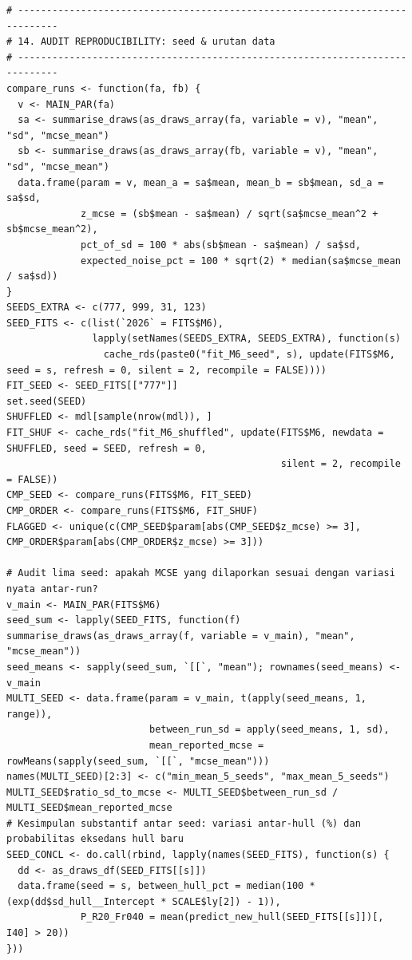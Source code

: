 \documentclass[
]{article}
\begin{document}
\begin{verbatim}
# -----------------------------------------------------------------------------
# 14. AUDIT REPRODUCIBILITY: seed & urutan data
# -----------------------------------------------------------------------------
compare_runs <- function(fa, fb) {
  v <- MAIN_PAR(fa)
  sa <- summarise_draws(as_draws_array(fa, variable = v), "mean", "sd", "mcse_mean")
  sb <- summarise_draws(as_draws_array(fb, variable = v), "mean", "sd", "mcse_mean")
  data.frame(param = v, mean_a = sa$mean, mean_b = sb$mean, sd_a = sa$sd,
             z_mcse = (sb$mean - sa$mean) / sqrt(sa$mcse_mean^2 + sb$mcse_mean^2),
             pct_of_sd = 100 * abs(sb$mean - sa$mean) / sa$sd,
             expected_noise_pct = 100 * sqrt(2) * median(sa$mcse_mean / sa$sd))
}
SEEDS_EXTRA <- c(777, 999, 31, 123)
SEED_FITS <- c(list(`2026` = FITS$M6),
               lapply(setNames(SEEDS_EXTRA, SEEDS_EXTRA), function(s)
                 cache_rds(paste0("fit_M6_seed", s), update(FITS$M6, seed = s, refresh = 0, silent = 2, recompile = FALSE))))
FIT_SEED <- SEED_FITS[["777"]]
set.seed(SEED)
SHUFFLED <- mdl[sample(nrow(mdl)), ]
FIT_SHUF <- cache_rds("fit_M6_shuffled", update(FITS$M6, newdata = SHUFFLED, seed = SEED, refresh = 0,
                                                silent = 2, recompile = FALSE))
CMP_SEED <- compare_runs(FITS$M6, FIT_SEED)
CMP_ORDER <- compare_runs(FITS$M6, FIT_SHUF)
FLAGGED <- unique(c(CMP_SEED$param[abs(CMP_SEED$z_mcse) >= 3], CMP_ORDER$param[abs(CMP_ORDER$z_mcse) >= 3]))

# Audit lima seed: apakah MCSE yang dilaporkan sesuai dengan variasi nyata antar-run?
v_main <- MAIN_PAR(FITS$M6)
seed_sum <- lapply(SEED_FITS, function(f) summarise_draws(as_draws_array(f, variable = v_main), "mean", "mcse_mean"))
seed_means <- sapply(seed_sum, `[[`, "mean"); rownames(seed_means) <- v_main
MULTI_SEED <- data.frame(param = v_main, t(apply(seed_means, 1, range)),
                         between_run_sd = apply(seed_means, 1, sd),
                         mean_reported_mcse = rowMeans(sapply(seed_sum, `[[`, "mcse_mean")))
names(MULTI_SEED)[2:3] <- c("min_mean_5_seeds", "max_mean_5_seeds")
MULTI_SEED$ratio_sd_to_mcse <- MULTI_SEED$between_run_sd / MULTI_SEED$mean_reported_mcse
# Kesimpulan substantif antar seed: variasi antar-hull (%) dan probabilitas eksedans hull baru
SEED_CONCL <- do.call(rbind, lapply(names(SEED_FITS), function(s) {
  dd <- as_draws_df(SEED_FITS[[s]])
  data.frame(seed = s, between_hull_pct = median(100 * (exp(dd$sd_hull__Intercept * SCALE$ly[2]) - 1)),
             P_R20_Fr040 = mean(predict_new_hull(SEED_FITS[[s]])[, I40] > 20))
}))


\end{verbatim}
\end{document}
